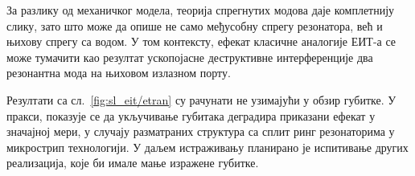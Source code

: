 \documentclass[main.tex]{subfiles}
\begin{document}
За разлику од механичког модела, теорија спрегнутих модова даје комплетнију слику, зато што може да опише не само међусобну спрегу резонатора, већ и њихову спрегу са водом. У том контексту, ефекат класичне аналогије ЕИТ-а се може тумачити као резултат ускопојасне деструктивне интерференције два резонантна мода на њиховом излазном порту.

Резултати са сл.~\ref{fig:sl_eit/etran} су рачунати не узимајући у обзир губитке. У пракси, показује се да укључивање губитака деградира приказани ефекат у значајној мери, у случају разматраних структура са сплит ринг резонаторима у микрострип технологији. У даљем истраживању планирано је испитивање других реализација, које би имале мање изражене губитке.

%
%
\end{document}

